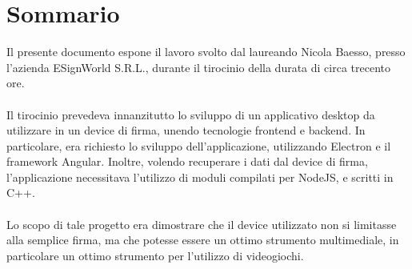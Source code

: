 \cleardoublepage
{}
{}
\begingroup
\let\clearpage\relax
\let\cleardoublepage\relax
\let\cleardoublepage\relax

\chapter*{Sommario}

Il presente documento espone il lavoro svolto dal laureando Nicola Baesso, presso l'azienda ESignWorld S.R.L., durante il tirocinio della durata di circa trecento ore.\\\\
Il tirocinio prevedeva innanzitutto lo sviluppo di un applicativo desktop da utilizzare in un device di firma, unendo tecnologie frontend e backend.
In particolare, era richiesto lo sviluppo dell'applicazione, utilizzando Electron e il framework Angular.
Inoltre, volendo recuperare i dati dal device di firma, l'applicazione necessitava l'utilizzo di moduli compilati per NodeJS, e scritti in C++.\\\\
Lo scopo di tale progetto era dimostrare che il device utilizzato non si limitasse alla semplice firma, ma che potesse essere un ottimo strumento multimediale, in particolare un ottimo strumento per l'utilizzo di videogiochi.




\endgroup

\vfill
